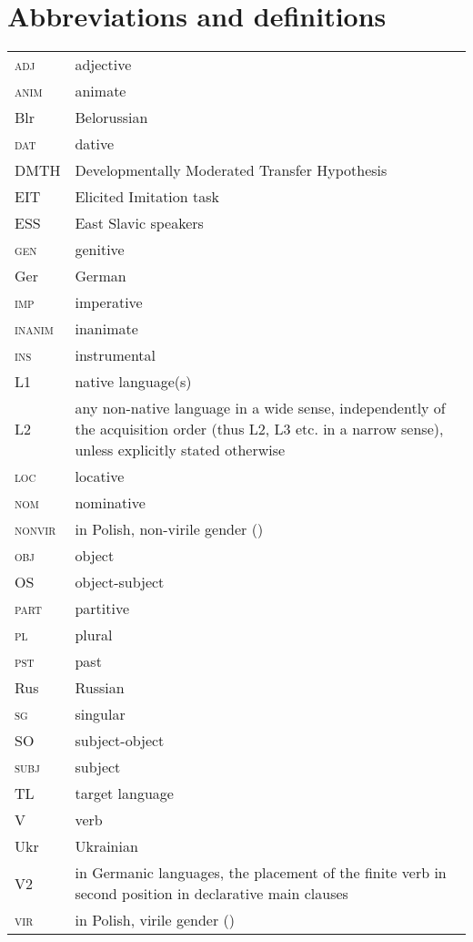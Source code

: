 \documentclass[output=paper,            colorlinks, citecolor=brown            		  ]{langscibook}
\begin{document}
\section*{Abbreviations and definitions}

\begin{tabularx}{\textwidth}{@{}lQ@{}}
\textsc{adj} & adjective\\
\textsc{anim} & animate\\
Blr & Belorussian\\
\textsc{dat} & dative\\
DMTH & Developmentally Moderated Transfer Hypothesis\\
EIT & Elicited Imitation task\\
ESS & East Slavic speakers\\
\textsc{gen} & genitive\\
Ger & German\\
\textsc{imp} & imperative\\
\textsc{inanim} & inanimate\\
\textsc{ins} & instrumental\\
L1 & native language(s)\\
L2 & any non-native language in a wide sense, independently of the acquisition order (thus L2, L3 etc. in a narrow sense), unless explicitly stated otherwise\\
\textsc{loc} & locative\\
\textsc{nom} & nominative\\ 
\textsc{nonvir} & in Polish, non-virile gender ()\\
\textsc{obj} & object\\
OS & object-subject\\
\textsc{part} & partitive\\
\textsc{pl} & plural\\
\textsc{pst} & past\\ 
Rus & Russian\\
\textsc{sg} & singular\\
SO & subject-object\\
\textsc{subj} & subject\\
TL & target language\\
V & verb\\
Ukr & Ukrainian\\
V2 & in Germanic languages, the placement of the finite verb in second position in declarative main clauses\\
\textsc{vir} & in Polish, virile gender ()\\
\end{tabularx}

\sloppy\printbibliography[heading=subbibliography,notkeyword=this]
\end{document}
